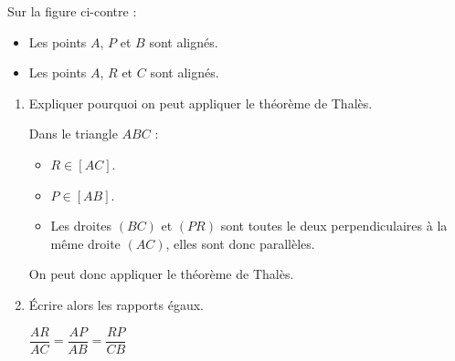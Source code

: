     \phantom{rrr}

    \begin{minipage}{0.65\linewidth}
         Sur la figure ci-contre :
        \begin{itemize}
            \item Les points $A$, $P$ et $B$ sont alignés.
            \item Les points $A$, $R$ et $C$ sont alignés.
        \end{itemize}
        \begin{enumerate}
            \item Expliquer pourquoi on peut appliquer le théorème de Thalès.

            {\color{red} Dans le triangle $ABC$ :
            \begin{itemize}
                \item $R \in [AC]$.
                \item $P \in [AB]$.
                \item Les droites $(BC)$ et $(PR)$ sont toutes le deux perpendiculaires à la même droite $(AC)$,
                elles sont donc parallèles.
            \end{itemize}
            On peut donc appliquer le théorème de Thalès.
            }
            \item Écrire alors les rapports égaux.

            {\color{red} $\dfrac{AR}{AC}=\dfrac{AP}{AB}=\dfrac{RP}{CB}$}
        \end{enumerate}
    \end{minipage}
    \begin{minipage}{0.3\linewidth}
        \hspace*{-3mm}
        \vspace*{-10mm}
    \end{minipage}
